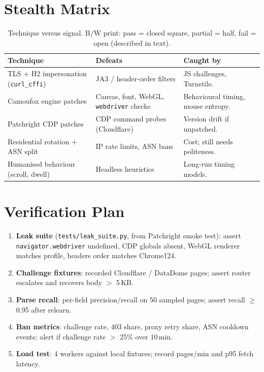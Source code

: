 \documentclass[11pt,a4paper]{article}
\begin{document}
\section{Stealth Matrix}
\begin{table}[H]
\centering
\caption{Technique versus signal. B/W print: pass = closed square, partial = half, fail = open (described in text).}
\begin{tabular}{@{}p{4cm}p{4cm}p{5.6cm}@{}}
\toprule
Technique & Defeats & Caught by \\
\midrule
TLS + H2 impersonation (\texttt{curl\_cffi}) & JA3 / header-order filters & JS challenges, Turnstile. \\
Camoufox engine patches & Canvas, font, WebGL, \texttt{webdriver} checks & Behavioural timing, mouse entropy. \\
Patchright CDP patches & CDP command probes (Cloudflare) & Version drift if unpatched. \\
Residential rotation + ASN split & IP rate limits, ASN bans & Cost; still needs politeness. \\
Humanised behaviour (scroll, dwell) & Headless heuristics & Long-run timing models. \\
\bottomrule
\end{tabular}
\end{table}

\section{Verification Plan}
\begin{enumerate}[leftmargin=*,itemsep=3pt]
\item \textbf{Leak suite} (\texttt{tests/leak\_suite.py}, from Patchright smoke test): assert \texttt{navigator.webdriver} undefined, CDP globals absent, WebGL renderer matches profile, headers order matches Chrome124.
\item \textbf{Challenge fixtures}: recorded Cloudflare / DataDome pages; assert router escalates and recovers body $>$ 5\,KB.
\item \textbf{Parse recall}: per-field precision/recall on 50 sampled pages; assert recall $\geq$ 0.95 after relearn.
\item \textbf{Ban metrics}: challenge rate, 403 share, proxy retry share, ASN cooldown events; alert if challenge rate $>$ 25\% over 10\,min.
\item \textbf{Load test}: 4 workers against local fixtures; record pages/min and p95 fetch latency.
\end{enumerate}
\end{document}
